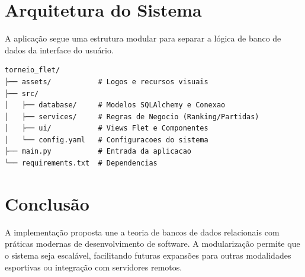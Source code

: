 \documentclass[a4paper,12pt]{article}
\begin{document}
\section{Arquitetura do Sistema}
A aplicação segue uma estrutura modular para separar a lógica de banco de dados da interface do usuário.

\begin{lstlisting}[basicstyle=\ttfamily\small, frame=single]
torneio_flet/
├── assets/           # Logos e recursos visuais
├── src/
│   ├── database/     # Modelos SQLAlchemy e Conexao
│   ├── services/     # Regras de Negocio (Ranking/Partidas)
│   ├── ui/           # Views Flet e Componentes
│   └── config.yaml   # Configuracoes do sistema
├── main.py           # Entrada da aplicacao
└── requirements.txt  # Dependencias
\end{lstlisting}

\section{Conclusão}
A implementação proposta une a teoria de bancos de dados relacionais com práticas modernas de desenvolvimento de software. A modularização permite que o sistema seja escalável, facilitando futuras expansões para outras modalidades esportivas ou integração com servidores remotos.
\end{document}
